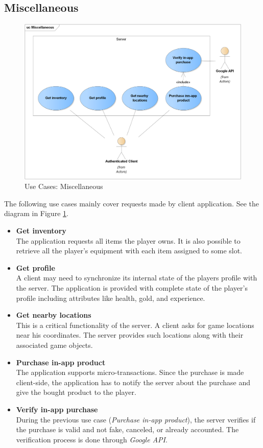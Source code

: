 	\subsection{Miscellaneous}
	\begin{figure}[h]	
		\includegraphics[width=\textwidth]{figures/UC_Miscellaneous}
		\centering			
		\caption{Use Cases: Miscellaneous}
		\label{fig:ucmisc}
	\end{figure}
	The following use cases mainly cover requests made by client application. See the diagram in Figure \ref{fig:ucmisc}.
	\begin{itemize}
		\item \textbf{Get inventory}\\
		The application requests all items the player owns. It is also possible to retrieve all the player's equipment with each item assigned to some slot.
		
		\item \textbf{Get profile}\\
		A client may need to synchronize its internal state of the players profile with the server. The application is provided with complete state of the player's profile including attributes like health, gold, and experience.
		
		
		\item \textbf{Get nearby locations}\\
		This is a critical functionality of the server. A client asks for game locations near his coordinates. The server provides such locations along with their associated game objects.
		
		
		\item \textbf{Purchase in-app product}\\
		The application supports micro-transactions. Since the purchase is made client-side, the application has to notify the server about the purchase and give the bought product to the player. 
		
		
		\item \textbf{Verify in-app purchase}\\
		During the previous use case (\textit{Purchase in-app product}), the server verifies if the purchase is valid and not fake, canceled, or already accounted. The verification process is done through \textit{Google API}.
		
		
	\end{itemize}
	

